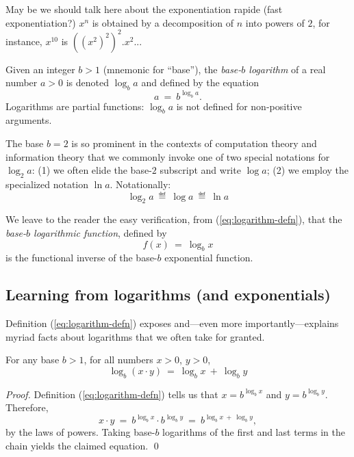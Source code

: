 {\Denis May be we should talk here about the exponentiation rapide (fast exponentiation?)}
\medskip
$x^n$ is obtained by a decomposition of $n$ into powers of $2$,
for instance, $x^10$ is $((x^{2})^2)^2.x^2$...

Given an integer $b >1$ (mnemonic for ``base''), the {\em base-$b$
  logarithm}
%
of a real number $a > 0$ is denoted $\log_b a$ and defined by the
equation
\begin{equation}
\label{eq:logarithm-defn}
a \ = \ b^{\log_b a}.
\end{equation}
Logarithms are partial functions: $\log_b a$ is not defined for
non-positive arguments.

The base $b = 2$ is so prominent in the contexts of computation theory
and information theory that we commonly invoke one of two special
notations for $\log_2 a$: (1) we often elide the base-$2$ subscript
and write $\log a$;
(2) we employ the specialized notation $\ln a$.  Notationally:
\[ \log_2 a \ \eqdef \ \log a \ \eqdef \ \ln a \]

We leave to the reader the easy verification, from
(\ref{eq:logarithm-defn}), that the {\it base-$b$ logarithmic
  function}, defined by
\begin{equation}
\label{eq:log-function-defn}
f(x) \ = \ \log_b x
\end{equation}
is the functional inverse of the base-$b$ exponential function.

\subsection{Learning from logarithms (and exponentials)}

Definition (\ref{eq:logarithm-defn}) exposes and---even more
importantly---explains myriad facts about logarithms that we often
take for granted.

\begin{prop}
For any base $b >1$, for all numbers $x >0$, $y>0$,
\[ \log_b (x \cdot y) \ = \ \log_b x \ + \ \log_b y \]
\end{prop}

\begin{proof}
Definition (\ref{eq:logarithm-defn}) tells us that $x = b^{\log_b x}$
and $y = b^{\log_b y}$.  Therefore,
\[ x \cdot y \ = \ b^{\log_b x} \cdot b^{\log_b y} \ = \
b^{\log_b x \ + \ \log_b y}, \]
by the laws of powers.  Taking base-$b$ logarithms of the first and
last terms in the chain yields the claimed equation.
\qed
\end{proof}



